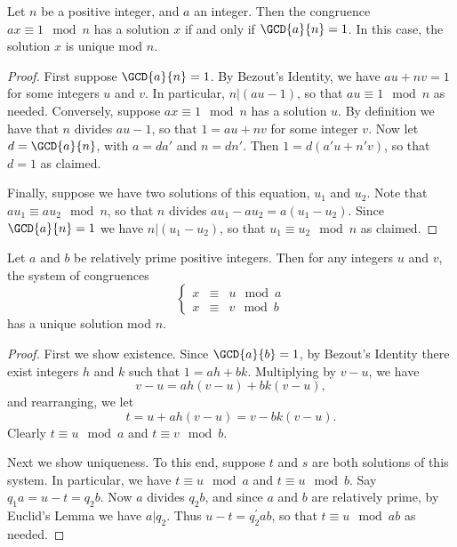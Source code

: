 \documentclass{article}
\begin{document}

\begin{thm}
Let $n$ be a positive integer, and $a$ an integer. Then the congruence $ax \equiv 1 \mod n$ has a solution $x$ if and only if $\GCD{a}{n} = 1$. In this case, the solution $x$ is unique mod $n$.
\end{thm}

\begin{proof}
First suppose $\GCD{a}{n} = 1$. By Bezout's Identity, we have $au + nv = 1$ for some integers $u$ and $v$. In particular, $n|(au - 1)$, so that $au \equiv 1 \mod n$ as needed. Conversely, suppose $ax \equiv 1 \mod n$ has a solution $u$. By definition we have that $n$ divides $au - 1$, so that $1 = au + nv$ for some integer $v$. Now let $d = \GCD{a}{n}$, with $a = da'$ and $n = dn'$. Then $1 = d(a'u + n'v)$, so that $d = 1$ as claimed.

Finally, suppose we have two solutions of this equation, $u_1$ and $u_2$. Note that $au_1 \equiv au_2 \mod n$, so that $n$ divides $au_1 - au_2 = a(u_1 - u_2)$. Since $\GCD{a}{n} = 1$ we have $n|(u_1 - u_2)$, so that $u_1 \equiv u_2 \mod n$ as claimed.
\end{proof}

\begin{thm}
Let $a$ and $b$ be relatively prime positive integers. Then for any integers $u$ and $v$, the system of congruences \[ \left\{ \begin{array}{rcl} x & \equiv & u \mod a \\ x & \equiv & v \mod b \end{array} \right. \] has a unique solution mod $n$.
\end{thm}

\begin{proof}
First we show existence. Since $\GCD{a}{b} = 1$, by Bezout's Identity there exist integers $h$ and $k$ such that $1 = ah + bk$. Multiplying by $v-u$, we have \[ v-u = ah(v-u) + bk(v-u), \] and rearranging, we let \[ t = u + ah(v-u) = v - bk(v-u). \] Clearly $t \equiv u \mod a$ and $t \equiv v \mod b$.

Next we show uniqueness. To this end, suppose $t$ and $s$ are both solutions of this system. In particular, we have $t \equiv u \mod a$ and $t \equiv u \mod b$. Say $q_1a = u - t = q_2b$. Now $a$ divides $q_2b$, and since $a$ and $b$ are relatively prime, by Euclid's Lemma we have $a|q_2$. Thus $u-t = q_2^\prime ab$, so that $t \equiv u \mod ab$ as needed.
\end{proof}
\end{document}
